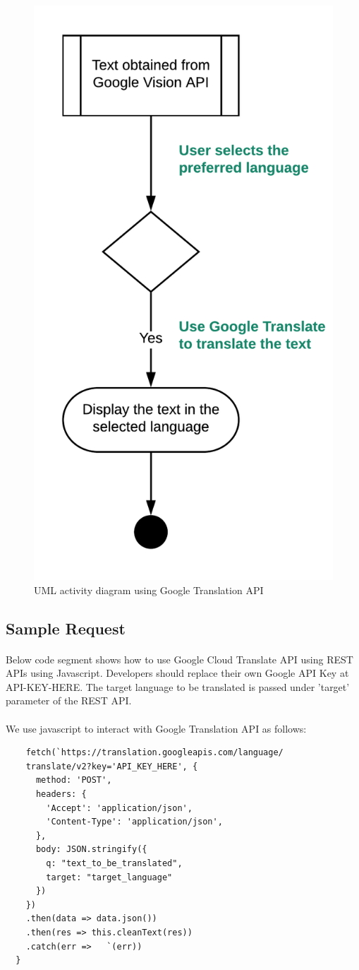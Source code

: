 \documentclass[12pt]{article}
\begin{document}
\begin{figure}[H]
	\centering
	\includegraphics[width=0.5\linewidth]{media/Translate.png}
	\caption{UML activity diagram using Google Translation API}
	\label{fig:translate_uml}
\end{figure} 

\subsection{Sample Request}

\paragraph{}Below code segment shows how to use Google Cloud Translate API using REST APIs using Javascript. Developers should replace their own Google API Key at  API-KEY-HERE. The target language to be translated is passed under 'target' parameter of the REST API. 

\paragraph{}We use javascript to interact with Google Translation API as follows:

\begin{lstlisting}
    fetch(`https://translation.googleapis.com/language/
    translate/v2?key='API_KEY_HERE', {
      method: 'POST',
      headers: {
        'Accept': 'application/json',
        'Content-Type': 'application/json',
      },
      body: JSON.stringify({
        q: "text_to_be_translated",
        target: "target_language"
      })
    })
    .then(data => data.json())
    .then(res => this.cleanText(res))
    .catch(err => 	`(err))
  }
\end{lstlisting}
\end{document}
